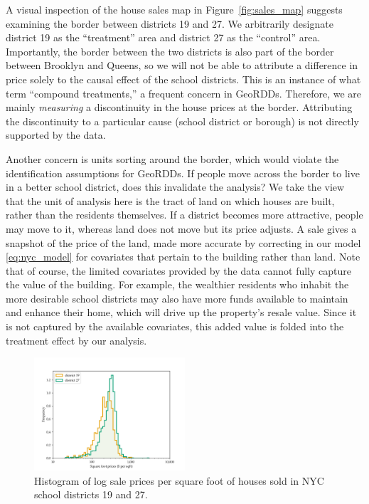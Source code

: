 \documentclass[letter,12pt]{article}
\begin{document}
A visual inspection of the house sales map in Figure~\ref{fig:sales_map} suggests examining the border between districts 19 and 27.
We arbitrarily designate district 19 as the ``treatment'' area and district 27 as the ``control'' area.
Importantly, the border between the two districts is also part of the border between Brooklyn and Queens, so we will not be able to attribute a difference in price solely to the causal effect of the school districts.
This is an instance of what \cite{keele_titiunik_2015} term ``compound treatments,'' a frequent concern in GeoRDDs.
Therefore, we are mainly \emph{measuring} a discontinuity in the house prices at the border.
Attributing the discontinuity to a particular cause (school district or borough) is not directly supported by the data.

Another concern is units sorting around the border, which would violate the identification assumptions for GeoRDDs.
If people move across the border to live in a better school district, does this invalidate the analysis?
We take the view that the unit of analysis here is the tract of land on which houses are built, rather than the residents themselves.
If a district becomes more attractive, people may move to it, whereas land does not move but its price adjusts.
A sale gives a snapshot of the price of the land, made more accurate by correcting in our model \eqref{eq:nyc_model} for covariates that pertain to the building rather than land.
Note that of course, the limited covariates provided by the data cannot fully capture the value of the building.
For example, the wealthier residents who inhabit the more desirable school districts may also have more funds available to maintain and enhance their home, which will drive up the property's resale value.
Since it is not captured by the available covariates, this added value is folded into the treatment effect by our analysis.

\begin{figure}[tb]
    \centering
    \includegraphics[width=0.5\textwidth]{../NYC/NYC_plots/sales_histogram_19-27.png}
    \caption{\label{fig:NYC_histogram}Histogram of log sale prices per square foot of houses sold in NYC school districts 19 and 27.}
\end{figure}
\end{document}
